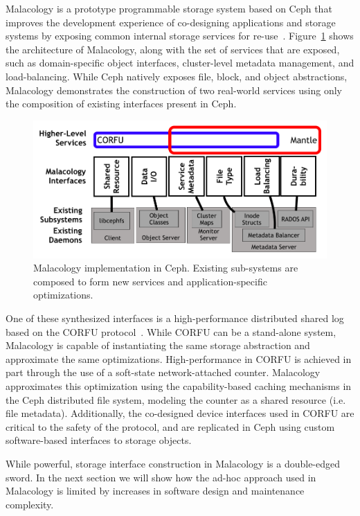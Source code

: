 Malacology is a prototype programmable storage system based on Ceph that
improves the development experience of co-designing applications and storage
systems by exposing common internal storage services for
re-use~\cite{sevilla:eurosys17}. Figure~\ref{fig:malacology} shows the
architecture of Malacology, along with the set of services that are exposed,
such as domain-specific object interfaces, cluster-level metadata management,
and load-balancing. While Ceph natively exposes file, block, and object
abstractions, Malacology demonstrates the construction of two real-world
services using only the composition of existing interfaces present in Ceph.

\begin{figure}[t]
\centering
\includegraphics[width=1.0\linewidth]{implementation-overview.png}
\caption{Malacology implementation in Ceph. Existing sub-systems are composed
    to form new services and application-specific optimizations.}
\label{fig:malacology}
\end{figure}

One of these synthesized interfaces is a high-performance distributed shared
log based on the CORFU protocol~\cite{balakrishnan:nsdi12}.  While CORFU can
be a stand-alone system, Malacology is capable of instantiating the same storage
abstraction and approximate the same optimizations. High-performance in CORFU
is achieved in part through the use of a soft-state network-attached counter.
Malacology approximates this optimization using the capability-based caching
mechanisms in the Ceph distributed file system, modeling the counter as a
shared resource (i.e. file metadata). Additionally, the co-designed device
interfaces used in CORFU are critical to the safety of the protocol, and are
replicated in Ceph using custom software-based interfaces to storage objects.

While powerful, storage interface construction in Malacology is a double-edged
sword. In the next section we will show how the ad-hoc approach used in
Malacology is limited by increases in software design and maintenance
complexity.
